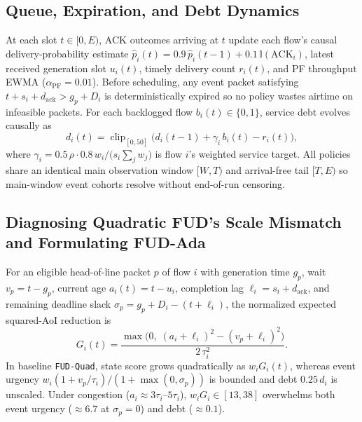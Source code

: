 \documentclass[journal]{IEEEtran}
\begin{document}
\subsection{Queue, Expiration, and Debt Dynamics}
At each slot $t \in [0, E)$, ACK outcomes arriving at $t$ update each flow's causal delivery-probability estimate $\hat{p}_i(t) = 0.9\,\hat{p}_i(t{-}1) + 0.1\,\mathbb{I}(\text{ACK}_i)$, latest received generation slot $u_i(t)$, timely delivery count $r_i(t)$, and PF throughput EWMA ($\alpha_{\text{PF}}{=}0.01$). Before scheduling, any event packet satisfying $t + s_i + d_{\text{ack}} > g_p + D_i$ is deterministically expired so no policy wastes airtime on infeasible packets. For each backlogged flow $b_i(t) \in \{0,1\}$, service debt evolves causally as
\begin{equation}
d_i(t) = \operatorname{clip}_{[0,50]}\!\big(d_i(t{-}1) + \gamma_i\, b_i(t) - r_i(t)\big),
\label{eq:debt}
\end{equation}
where $\gamma_i = 0.5\,\rho\cdot 0.8\,w_i / \big(s_i \sum_j w_j\big)$ is flow $i$'s weighted service target. All policies share an identical main observation window $[W, T)$ and arrival-free tail $[T, E)$ so main-window event cohorts resolve without end-of-run censoring.

\subsection{Diagnosing Quadratic FUD's Scale Mismatch and Formulating FUD-Ada}
For an eligible head-of-line packet $p$ of flow $i$ with generation time $g_p$, wait $v_p = t - g_p$, current age $a_i(t) = t - u_i$, completion lag $\ell_i = s_i + d_{\text{ack}}$, and remaining deadline slack $\sigma_p = g_p + D_i - (t + \ell_i)$, the normalized expected squared-AoI reduction is
\begin{equation}
G_i(t) = \frac{\max\!\big(0,\; (a_i + \ell_i)^2 - (v_p + \ell_i)^2\big)}{2\,\tau_i^2}.
\label{eq:raw_gain}
\end{equation}
In baseline \texttt{FUD-Quad}, state score grows quadratically as $w_i G_i(t)$, whereas event urgency $w_i(1 + v_p/\tau_i)/(1 + \max(0,\sigma_p))$ is bounded and debt $0.25\,d_i$ is unscaled. Under congestion ($a_i \approx 3\tau_i$--$5\tau_i$), $w_i G_i \in [13, 38]$ overwhelms both event urgency ($\approx 6.7$ at $\sigma_p{=}0$) and debt ($\approx 0.1$).
\end{document}
